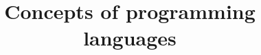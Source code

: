 \documentclass[a4paper]{article}
\title{Concepts of programming languages}
\begin{document}
    \maketitle
    \tableofcontents
    \pagebreak
    
\end{document}
